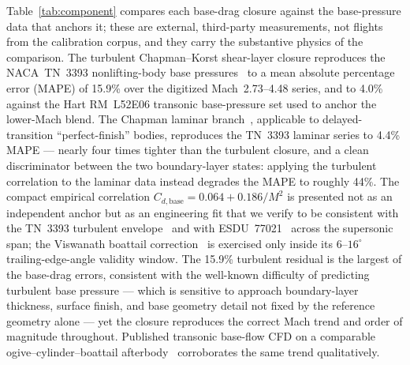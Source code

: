 Table~\ref{tab:component} compares each base-drag closure against the
base-pressure data that anchors it; these are external, third-party
measurements, not flights from the calibration corpus, and they carry the
substantive physics of the comparison. The turbulent Chapman--Korst
shear-layer closure reproduces the NACA~TN~3393 nonlifting-body base
pressures~\cite{chapman1955} to a mean absolute percentage error (MAPE) of
15.9\% over the digitized Mach~2.73--4.48 series, and to 4.0\% against the Hart
RM~L52E06 transonic base-pressure set used to anchor the lower-Mach blend. The
Chapman laminar branch~\cite{chapman1955}, applicable to delayed-transition
``perfect-finish'' bodies, reproduces the TN~3393 laminar series to 4.4\%
MAPE --- nearly four times tighter than the turbulent closure, and a clean
discriminator between the two boundary-layer states: applying the turbulent
correlation to the laminar data instead degrades the MAPE to roughly 44\%. The
compact empirical correlation $C_{d,\text{base}} = 0.064 + 0.186/M^2$ is
presented not as an independent anchor but as an engineering fit that we verify
to be consistent with the TN~3393 turbulent envelope~\cite{chapman1955} and
with ESDU~77021~\cite{esdu77021} across the supersonic span; the Viswanath
boattail correction~\cite{viswanath1996} is exercised only inside its
$6$--$16^{\circ}$ trailing-edge-angle validity window. The 15.9\% turbulent
residual is the largest of the base-drag errors, consistent with the
well-known difficulty of predicting turbulent base pressure --- which is
sensitive to approach boundary-layer thickness, surface finish, and base
geometry detail not fixed by the reference geometry alone --- yet the closure
reproduces the correct Mach trend and order of magnitude throughout. Published
transonic base-flow CFD on a comparable ogive--cylinder--boattail
afterbody~\cite{sahu1983} corroborates the same trend qualitatively.


